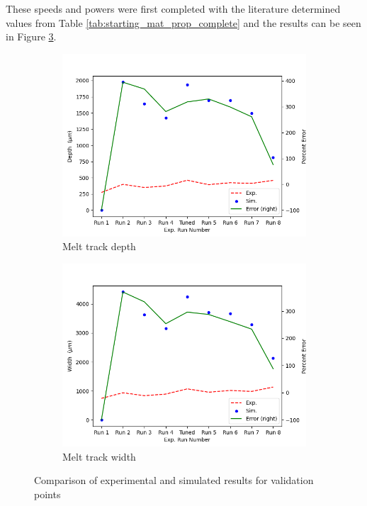 \documentclass[pdflatex,sn-mathphys]{sn-jnl}
\begin{document}
	These speeds and powers were first completed with the literature determined values from Table \ref{tab:starting_mat_prop_complete} and the results can be seen in Figure \ref{fig:melt_track_val_baseline}.
	\begin{figure}[!htb]\centering
		\begin{subfigure}[c]{0.45\textwidth}\centering
		\includegraphics[width=\textwidth]{melt_track_val_baseline_depth}
		\caption{Melt track depth}
		\label{fig:melt_track_val_baseline_depth}
		\end{subfigure}\hfill{}
			\begin{subfigure}[c]{0.45\textwidth}\centering
			\includegraphics[width=\textwidth]{melt_track_val_baseline_width}
			\caption{Melt track width}
			\label{fig:melt_track_val_baseline_width}
			\end{subfigure}
		\caption{Comparison of experimental and simulated results for validation points}
		\label{fig:melt_track_val_baseline}
	\end{figure}
\end{document}
